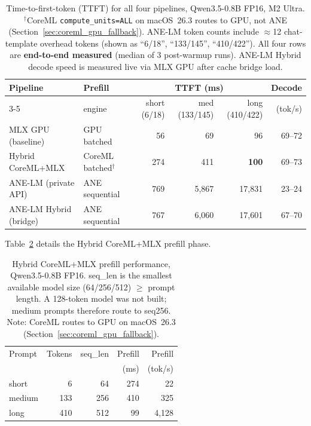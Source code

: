 \documentclass[11pt]{article}
\begin{document}
\begin{table}[t]
\centering
\small
\begin{tabular}{@{}llrrrr@{}}
\toprule
Pipeline & Prefill & \multicolumn{3}{c}{TTFT (ms)} & Decode \\
\cmidrule(lr){3-5}
 & engine & short (6/18) & med (133/145) & long (410/422) & (tok/s) \\
\midrule
MLX GPU (baseline) & GPU batched & 56 & 69 & 96 & 69--72 \\
Hybrid CoreML+MLX & CoreML batched$^\dagger$ & 274 & 411 & \textbf{100} & 69--73 \\
ANE-LM (private API) & ANE sequential & 769 & 5{,}867 & 17{,}831 & 23--24 \\
ANE-LM Hybrid (bridge) & ANE sequential & 767 & 6{,}060 & 17{,}601 & 67--70 \\
\bottomrule
\end{tabular}
\caption{Time-to-first-token (TTFT) for all four pipelines, Qwen3.5-0.8B FP16, M2 Ultra.
  $^\dagger$CoreML \texttt{compute\_units=ALL} on macOS~26.3 routes to GPU, not ANE
  (Section~\ref{sec:coreml_gpu_fallback}).
  ANE-LM token counts include $\approx$12 chat-template overhead tokens (shown as
  ``6/18'', ``133/145'', ``410/422'').
  All four rows are \textbf{end-to-end measured} (median of 3 post-warmup runs).
  ANE-LM Hybrid decode speed is measured live via MLX GPU after cache bridge load.}
\label{tab:pipeline_ttft}
\end{table}

Table~\ref{tab:hybrid_ane} details the Hybrid CoreML+MLX prefill phase.

\begin{table}[h]
\centering
\small
\begin{tabular}{@{}lrrrr@{}}
\toprule
Prompt & Tokens & seq\_len & Prefill & Prefill \\
 & & & (ms) & (tok/s) \\
\midrule
short & 6 & 64 & 274 & 22 \\
medium & 133 & 256 & 410 & 325 \\
long & 410 & 512 & 99 & 4{,}128 \\
\bottomrule
\end{tabular}
\caption{Hybrid CoreML+MLX prefill performance, Qwen3.5-0.8B FP16.
  seq\_len is the smallest available model size (64/256/512) $\geq$ prompt length.
  A 128-token model was not built; medium prompts therefore route to seq256.
  Note: CoreML routes to GPU on macOS~26.3 (Section~\ref{sec:coreml_gpu_fallback}).}
\label{tab:hybrid_ane}
\end{table}
\end{document}
